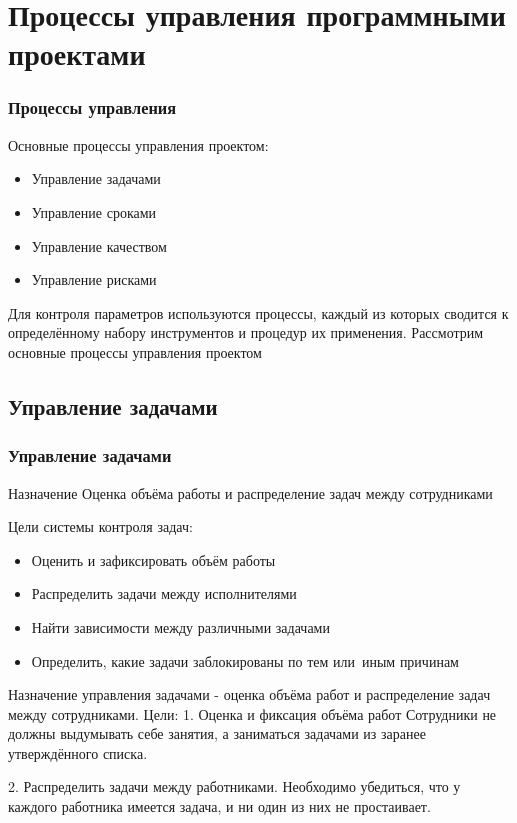 \documentclass{../industrial-development}
\begin{document}
\section{Процессы управления программными проектами}

\begin{frame} \frametitle{Процессы управления}
	Основные процессы управления проектом:
	\begin{itemize}
		\item Управление задачами
		\item Управление сроками
		\item Управление качеством
		\item Управление рисками
	\end{itemize}
\end{frame}
\lecturenotes
Для контроля параметров используются процессы, каждый из которых сводится к определённому набору инструментов и процедур их применения. Рассмотрим основные процессы управления проектом

\subsection{Управление задачами}

\begin{frame} \frametitle{Управление задачами}
	\begin{block}{Назначение}
		Оценка объёма работы и распределение задач между сотрудниками
	\end{block}
	Цели системы контроля задач:
	\begin{itemize}
		\item Оценить и зафиксировать объём работы
		\item Распределить задачи между исполнителями
		\item Найти зависимости между различными задачами
		\item Определить, какие задачи заблокированы по тем или~иным причинам
	\end{itemize}
\end{frame}
\lecturenotes
Назначение управления задачами - оценка объёма работ и распределение задач между сотрудниками.
Цели:
1. Оценка и фиксация объёма работ
Сотрудники не должны выдумывать себе занятия, а заниматься задачами из заранее утверждённого списка.

2. Распределить задачи между работниками.
Необходимо убедиться, что у каждого работника имеется задача, и ни один из них не простаивает.
\end{document}
